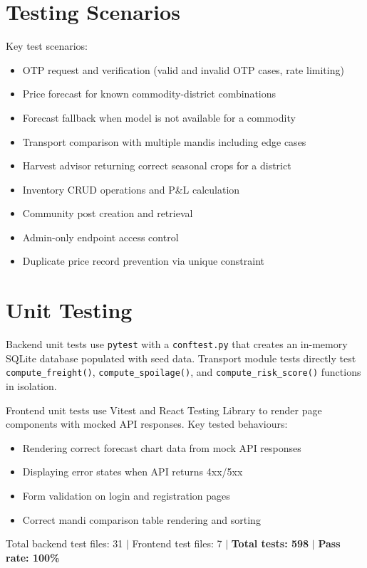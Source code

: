 \documentclass[12pt,a4paper]{report}
\begin{document}
\section{Testing Scenarios}

Key test scenarios:
\begin{itemize}
    \item OTP request and verification (valid and invalid OTP cases, rate limiting)
    \item Price forecast for known commodity-district combinations
    \item Forecast fallback when model is not available for a commodity
    \item Transport comparison with multiple mandis including edge cases
    \item Harvest advisor returning correct seasonal crops for a district
    \item Inventory CRUD operations and P\&L calculation
    \item Community post creation and retrieval
    \item Admin-only endpoint access control
    \item Duplicate price record prevention via unique constraint
\end{itemize}

\section{Unit Testing}

Backend unit tests use \texttt{pytest} with a \texttt{conftest.py} that creates an
in-memory SQLite database populated with seed data. Transport module tests directly test
\texttt{compute\_freight()}, \texttt{compute\_spoilage()}, and
\texttt{compute\_risk\_score()} functions in isolation.

Frontend unit tests use Vitest and React Testing Library to render page components with
mocked API responses. Key tested behaviours:
\begin{itemize}
    \item Rendering correct forecast chart data from mock API responses
    \item Displaying error states when API returns 4xx/5xx
    \item Form validation on login and registration pages
    \item Correct mandi comparison table rendering and sorting
\end{itemize}

Total backend test files: 31 $\mid$ Frontend test files: 7 $\mid$
\textbf{Total tests: 598} $\mid$ \textbf{Pass rate: 100\%}
\end{document}
